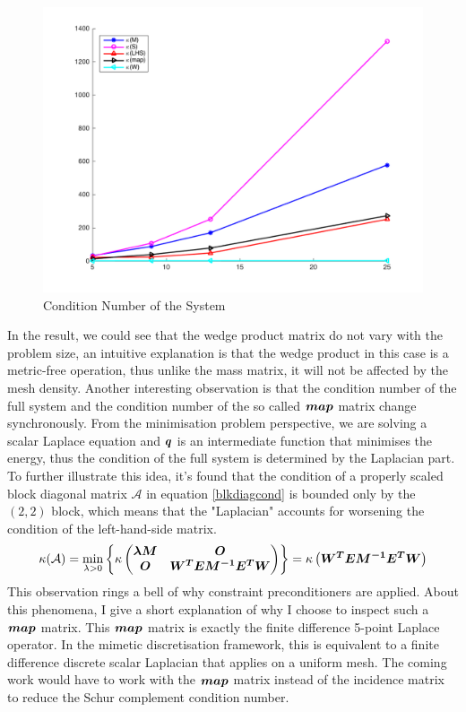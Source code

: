 \begin{figure}[H]
	\centering
	\includegraphics[width=.85\textwidth]{cond}
	\caption{Condition Number of the System}
	\label{cond}
\end{figure}
In the result, we could see that the wedge product matrix do not vary with the problem size, an intuitive explanation is that the wedge product in this case is a metric-free operation, thus unlike the mass matrix, it will not be affected by the mesh density. Another interesting observation is that the condition number of the full system and the condition number of the so called $\boldsymbol{map}$ matrix change synchronously. From the minimisation problem perspective, we are solving a scalar Laplace equation and $\boldsymbol{q}$ is an intermediate function that minimises the energy, thus the condition of the full system is determined by the Laplacian part. To further illustrate this idea, it's found that the condition of a properly scaled block diagonal matrix $\mathcal{A}$ in equation \ref{blkdiagcond} is bounded only by the $(2,2)$ block, which means that the "Laplacian" accounts for worsening the condition of the left-hand-side matrix.  
\begin{equation}\label{blkdiagcond}
	\kappa(\mathcal{A}) = \min_{\lambda>0} \left\lbrace \kappa
	\begin{pmatrix}
		\boldsymbol{\lambda M} & \boldsymbol{O} \\
		\boldsymbol{O} & \boldsymbol{W^T E M^{-1} E^T W} \\
	\end{pmatrix}	 \right\rbrace = \kappa\left(\boldsymbol{W^T E M^{-1} E^T W} \right) 
\end{equation}
This observation rings a bell of why constraint preconditioners are applied. About this phenomena, I give a short explanation of why I choose to inspect such a $\boldsymbol{map}$ matrix. This $\boldsymbol{map}$ matrix is exactly the finite difference 5-point Laplace operator. In the mimetic discretisation framework, this is equivalent to a finite difference discrete scalar Laplacian that applies on a uniform mesh. The coming work would have to work with the $\boldsymbol{map}$ matrix instead of the incidence matrix to reduce the Schur complement condition number.    \\

